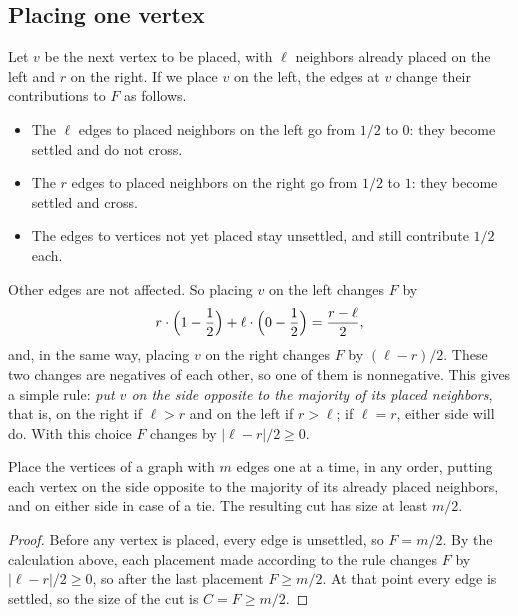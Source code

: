 \subsection*{Placing one vertex}
Let $v$ be the next vertex to be placed, with $\ell$ neighbors already placed on the left and $r$ on the right. If we place $v$ on the left, the edges at $v$ change their contributions to $F$ as follows.
\begin{itemize}
\item The $\ell$ edges to placed neighbors on the left go from $1/2$ to $0$: they become settled and do not cross.
\item The $r$ edges to placed neighbors on the right go from $1/2$ to $1$: they become settled and cross.
\item The edges to vertices not yet placed stay unsettled, and still contribute $1/2$ each.
\end{itemize}
Other edges are not affected. So placing $v$ on the left changes $F$ by
\[
r\cdot\Bigl(1-\frac12\Bigr)+\ell\cdot\Bigl(0-\frac12\Bigr)=\frac{r-\ell}{2},
\]
and, in the same way, placing $v$ on the right changes $F$ by $(\ell-r)/2$. These two changes are negatives of each other, so one of them is nonnegative. This gives a simple rule: \emph{put $v$ on the side opposite to the majority of its placed neighbors}, that is, on the right if $\ell>r$ and on the left if $r>\ell$; if $\ell=r$, either side will do. With this choice $F$ changes by $|\ell-r|/2\ge0$.

\par\noindent\begin{minipage}{\linewidth}
\begin{proposition}\label{ch13:prop:greedy}
Place the vertices of a graph with $m$ edges one at a time, in any order, putting each vertex on the side opposite to the majority of its already placed neighbors, and on either side in case of a tie. The resulting cut has size at least $m/2$.
\end{proposition}
\end{minipage}\par

\begin{proof}
Before any vertex is placed, every edge is unsettled, so $F=m/2$. By the calculation above, each placement made according to the rule changes $F$ by $|\ell-r|/2\ge0$, so after the last placement $F\ge m/2$. At that point every edge is settled, so the size of the cut is $C=F\ge m/2$.
\end{proof}

